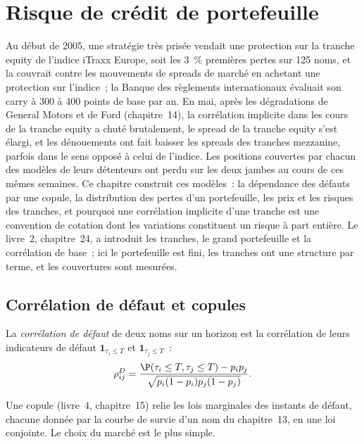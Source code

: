 \chapter{Risque de crédit de portefeuille}\label{ch:rc:portfolio-credit}

Au début de 2005, une stratégie très prisée vendait une protection sur la tranche equity de l'indice
iTraxx Europe, soit les 3~\% premières pertes sur 125 noms, et la couvrait contre les mouvements
de spreads de marché en achetant une protection sur l'indice~; la Banque des règlements internationaux
évaluait son carry à 300 à 400 points de base par an. En mai, après les dégradations de General
Motors et de Ford (chapitre~14), la corrélation implicite dans les cours de la tranche equity a chuté
brutalement, le spread de la tranche equity s'est élargi, et les dénouements ont fait baisser les spreads
des tranches mezzanine, parfois dans le sens opposé à celui de l'indice. Les positions
couvertes par chacun des modèles de leurs détenteurs ont perdu sur les deux jambes au cours de
ces mêmes semaines. Ce chapitre construit ces modèles~: la dépendance des défauts par une copule, la
distribution des pertes d'un portefeuille, les prix et les risques des tranches, et pourquoi une corrélation
implicite d'une tranche est une convention de cotation dont les variations constituent un risque à part entière.
Le livre~2, chapitre~24, a introduit les tranches, le grand portefeuille et la corrélation de base~;
ici le portefeuille est fini, les tranches ont une structure par terme, et les couvertures sont mesurées.

\section{Corrélation de défaut et copules}

\begin{definition}\label{def:rc:portfolio-credit:dc}
La \emph{corrélation de défaut} de deux noms sur un horizon est
la corrélation de leurs indicateurs de défaut $\mathbf 1_{\tau_i\le T}$ et
$\mathbf 1_{\tau_j\le T}$~:
\[
\rho^{D}_{ij} = \frac{\P(\tau_i\le T,\tau_j\le T)-p_ip_j}{\sqrt{p_i(1-p_i)p_j(1-p_j)}}.
\]
\end{definition}

Une copule (livre~4, chapitre~15) relie les lois marginales des instants de défaut,
chacune donnée par la courbe de survie d'un nom du chapitre~13, en une loi conjointe.
Le choix du marché est le plus simple.

